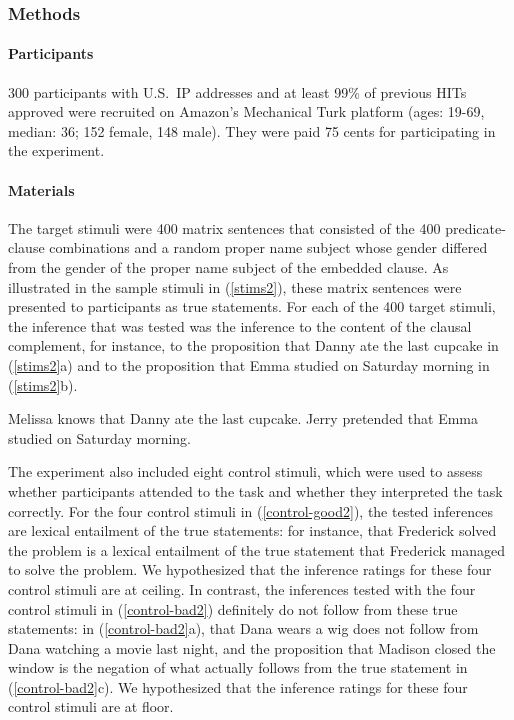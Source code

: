 \documentclass[11pt,fleqn]{article}
\newcommand{\6}{\mbox{$[\hspace*{-.6mm}[$}}
\newcommand{\9}{\mbox{$]\hspace*{-.6mm}]$}}
\begin{document}
\subsubsection{Methods}

\paragraph{Participants} 300 participants with U.S.\ IP addresses and at least 99\% of previous HITs approved were recruited on Amazon's Mechanical Turk platform (ages: 19-69, median: 36; 152 female, 148 male). They were paid 75 cents for participating in the experiment.

\paragraph{Materials} The target stimuli were 400 matrix sentences that consisted of the 400 predicate-clause combinations and a random proper name subject whose gender differed from the gender of the proper name subject of the embedded clause. As illustrated in the sample stimuli in (\ref{stims2}), these matrix sentences were presented to participants as true statements. For each of the 400 target stimuli, the inference that was tested was the inference to the content of the clausal complement, for instance, to the proposition that Danny ate the last cupcake in (\ref{stims2}a) and to the proposition that Emma studied on Saturday morning in (\ref{stims2}b).

\begin{exe}
\ex\label{stims2}
\begin{xlist}
 Melissa knows that Danny ate the last cupcake.
 Jerry pretended that Emma studied on Saturday morning.
\end{xlist}
\end{exe}

The experiment also included eight control stimuli, which were used to assess whether participants attended to the task and whether they interpreted the task correctly. For the four control stimuli in (\ref{control-good2}), the tested inferences are lexical entailment of the true statements: for instance, that Frederick solved the problem is a lexical entailment of the true statement that Frederick managed to solve the problem. We hypothesized that the inference ratings for these four control stimuli are at ceiling. In contrast, the inferences tested with the four control stimuli in (\ref{control-bad2}) definitely do not follow from these true statements: in (\ref{control-bad2}a), that Dana wears a wig does not follow from Dana watching a movie last night, and the proposition that Madison closed the window is the negation of what actually follows from the true statement in (\ref{control-bad2}c). We hypothesized that the inference ratings for these four control stimuli are at floor.
\end{document}
